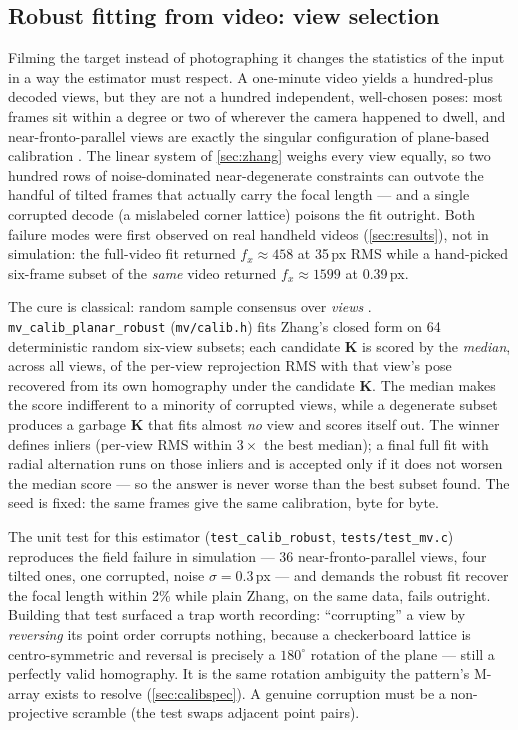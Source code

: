 \documentclass[11pt]{article}
\theoremstyle{definition}
\newcommand{\mat}[1]{\mathbf{#1}}
\newcommand{\K}{\mat{K}}
\newcommand{\code}[1]{\texttt{#1}}
\begin{document}
\subsection{Robust fitting from video: view selection}
\label{sec:calibrobust}

Filming the target instead of photographing it changes the statistics of
the input in a way the estimator must respect. A one-minute video yields a
hundred-plus decoded views, but they are not a hundred independent,
well-chosen poses: most frames sit within a degree or two of wherever the
camera happened to dwell, and near-fronto-parallel views are exactly the
singular configuration of plane-based calibration
\cite{SturmMaybank1999}. The linear system of \autoref{sec:zhang} weighs
every view equally, so two hundred rows of noise-dominated near-degenerate
constraints can outvote the handful of tilted frames that actually carry
the focal length --- and a single corrupted decode (a mislabeled corner
lattice) poisons the fit outright. Both failure modes were first observed
on real handheld videos (\autoref{sec:results}), not in simulation:
the full-video fit returned $f_x\approx458$ at 35\,px RMS while a
hand-picked six-frame subset of the \emph{same} video returned
$f_x\approx1599$ at 0.39\,px.

The cure is classical: random sample consensus over \emph{views}
\cite{FischlerBolles1981}. \code{mv\_calib\_planar\_robust}
(\code{mv/calib.h}) fits Zhang's closed form on 64 deterministic random
six-view subsets; each candidate $\K$ is scored by the \emph{median},
across all views, of the per-view reprojection RMS with that view's pose
recovered from its own homography under the candidate $\K$. The median
makes the score indifferent to a minority of corrupted views, while a
degenerate subset produces a garbage $\K$ that fits almost \emph{no} view
and scores itself out. The winner defines inliers (per-view RMS within
$3\times$ the best median); a final full fit with radial alternation runs
on those inliers and is accepted only if it does not worsen the median
score --- so the answer is never worse than the best subset found. The
seed is fixed: the same frames give the same calibration, byte for byte.

The unit test for this estimator (\code{test\_calib\_robust},
\code{tests/test\_mv.c}) reproduces the field failure in simulation ---
36 near-fronto-parallel views, four tilted ones, one corrupted, noise
$\sigma=0.3$\,px --- and demands the robust fit recover the focal length
within 2\% while plain Zhang, on the same data, fails outright. Building
that test surfaced a trap worth recording: ``corrupting'' a view by
\emph{reversing} its point order corrupts nothing, because a checkerboard
lattice is centro-symmetric and reversal is precisely a $180^\circ$
rotation of the plane --- still a perfectly valid homography. It is the
same rotation ambiguity the pattern's M-array exists to resolve
(\autoref{sec:calibspec}). A genuine corruption must be a non-projective
scramble (the test swaps adjacent point pairs).
\end{document}
